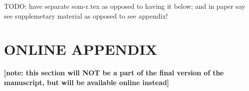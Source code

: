 \documentclass[10pt, letterpaper]{article}
\begin{document}
\begin{spacing}{1.4}


TODO: have separate som-r.tex as opposed to having it below; and in paper say
see supplemetary material as opposed to see appendix!

 \section*{\Huge ONLINE APPENDIX}
 \textbf{[note: this section will NOT be a part of the final version of
   the manuscript, but will be available online instead]} %





\end{spacing}
\end{document}
